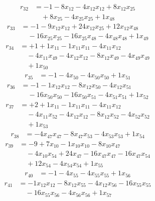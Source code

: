 \[\begin{aligned}
r_{32} &= - 1 - 8 x_{12} - 4 x_{12} x_{12} + 8 x_{12} x_{25} \\
 &\quad + 8 x_{25} - 4 x_{25} x_{25} + 1 x_{48}
\end{aligned}\]
\[\begin{aligned}
r_{33} &= - 1 - 9 x_{12} x_{12} + 24 x_{12} x_{25} + 12 x_{12} x_{48} \\
 &\quad - 16 x_{25} x_{25} - 16 x_{25} x_{48} - 4 x_{48} x_{48} + 1 x_{49}
\end{aligned}\]
\[\begin{aligned}
r_{34} &= + 1 + 1 x_{11} - 1 x_{11} x_{11} - 4 x_{11} x_{12} \\
 &\quad - 4 x_{11} x_{49} - 4 x_{12} x_{12} - 8 x_{12} x_{49} - 4 x_{49} x_{49} \\
 &\quad + 1 x_{50}
\end{aligned}\]
\[\begin{aligned}
r_{35} &= - 1 - 4 x_{50} - 4 x_{50} x_{50} + 1 x_{51}
\end{aligned}\]
\[\begin{aligned}
r_{36} &= - 1 - 1 x_{12} x_{12} - 8 x_{12} x_{50} - 4 x_{12} x_{51} \\
 &\quad - 16 x_{50} x_{50} - 16 x_{50} x_{51} - 4 x_{51} x_{51} + 1 x_{52}
\end{aligned}\]
\[\begin{aligned}
r_{37} &= + 2 + 1 x_{11} - 1 x_{11} x_{11} - 4 x_{11} x_{12} \\
 &\quad - 4 x_{11} x_{52} - 4 x_{12} x_{12} - 8 x_{12} x_{52} - 4 x_{52} x_{52} \\
 &\quad + 1 x_{53}
\end{aligned}\]
\[\begin{aligned}
r_{38} &= - 4 x_{47} x_{47} - 8 x_{47} x_{53} - 4 x_{53} x_{53} + 1 x_{54}
\end{aligned}\]
\[\begin{aligned}
r_{39} &= - 9 + 7 x_{10} - 1 x_{10} x_{10} - 8 x_{10} x_{47} \\
 &\quad - 4 x_{10} x_{54} + 24 x_{47} - 16 x_{47} x_{47} - 16 x_{47} x_{54} \\
 &\quad + 12 x_{54} - 4 x_{54} x_{54} + 1 x_{55}
\end{aligned}\]
\[\begin{aligned}
r_{40} &= - 1 - 4 x_{55} - 4 x_{55} x_{55} + 1 x_{56}
\end{aligned}\]
\[\begin{aligned}
r_{41} &= - 1 x_{12} x_{12} - 8 x_{12} x_{55} - 4 x_{12} x_{56} - 16 x_{55} x_{55} \\
 &\quad - 16 x_{55} x_{56} - 4 x_{56} x_{56} + 1 x_{57}
\end{aligned}\]
